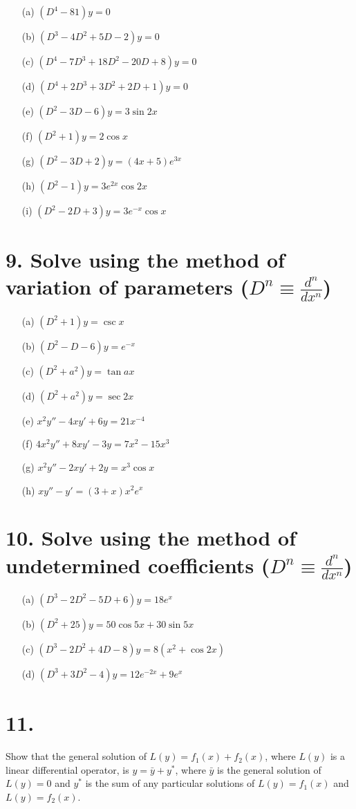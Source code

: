 \documentclass[12pt]{article}
\begin{document}
\begin{enumerate}
  \item[(a)] $ (D^4 - 81)y = 0 $
  \item[(b)] $ (D^3 - 4D^2 + 5D - 2)y = 0 $
  \item[(c)] $ (D^4 - 7D^3 + 18D^2 - 20D + 8)y = 0 $
  \item[(d)] $ (D^4 + 2D^3 + 3D^2 + 2D + 1)y = 0 $
  \item[(e)] $ (D^2 - 3D - 6)y = 3 \sin 2x $
  \item[(f)] $ (D^2 + 1)y = 2 \cos x $
  \item[(g)] $ (D^2 - 3D + 2)y = (4x + 5)e^{3x} $
  \item[(h)] $ (D^2 - 1)y = 3e^{2x} \cos 2x $
  \item[(i)] $ (D^2 - 2D + 3)y = 3e^{-x} \cos x $
\end{enumerate}

\section*{9. Solve using the method of variation of parameters ($ D^n \equiv \frac{d^n}{dx^n} $)}

\begin{enumerate}
  \item[(a)] $ (D^2 + 1)y = \csc x $
  \item[(b)] $ (D^2 - D - 6)y = e^{-x} $
  \item[(c)] $ (D^2 + a^2)y = \tan a x $
  \item[(d)] $ (D^2 + a^2)y = \sec 2x $
  \item[(e)] $ x^2 y'' - 4x y' + 6y = 21x^{-4} $
  \item[(f)] $ 4x^2 y'' + 8x y' - 3y = 7x^2 - 15x^3 $
  \item[(g)] $ x^2 y'' - 2x y' + 2y = x^3 \cos x $
  \item[(h)] $ x y'' - y' = (3 + x)x^2 e^x $
\end{enumerate}

\section*{10. Solve using the method of undetermined coefficients ($ D^n \equiv \frac{d^n}{dx^n} $)}

\begin{enumerate}
  \item[(a)] $ (D^3 - 2D^2 - 5D + 6)y = 18e^x $
  \item[(b)] $ (D^2 + 25)y = 50 \cos 5x + 30 \sin 5x $
  \item[(c)] $ (D^3 - 2D^2 + 4D - 8)y = 8(x^2 + \cos 2x) $
  \item[(d)] $ (D^3 + 3D^2 - 4)y = 12e^{-2x} + 9e^x $
\end{enumerate}

\section*{11.}
Show that the general solution of $ L(y) = f_1(x) + f_2(x) $, where $ L(y) $ is a linear differential operator, is $ y = \bar{y} + y^* $, where $ \bar{y} $ is the general solution of $ L(y) = 0 $ and $ y^* $ is the sum of any particular solutions of $ L(y) = f_1(x) $ and $ L(y) = f_2(x) $.
\end{document}
